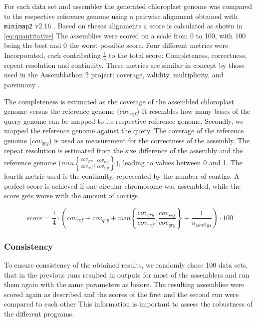 \documentclass{bmcart}
\begin{document}

For each data set and assembler the generated chloroplast genome was compared to the respective reference genome using a pairwise alignment obtained with \texttt{minimap2} v2.16 \cite{li2018minimap2}. Based on theses alignments a score is calculated as shown in \cref{eq:quantitative}
The assemblies were scored on a scale from 0 to 100, with 100 being the best and 0 the worst possible score. Four different metrics were Incorporated, each contributing  $\frac{1}{4}$ to the total score: Completeness, correctness, repeat resolution and continuity.
These metrics are similar in concept by those used in the Assemblathon 2 project: coverage, validity, multiplicity, and parsimony \cite{assemblathon2}.

The completeness is estimated as the coverage of the assembled chloroplast genome versus the reference genome ($cov_{ref}$)
It resembles how many bases of the query genome can be mapped to its respective reference genome.
Secondly, we mapped the reference genome against the query.
The coverage of the reference genome ($cov_{qry}$) is used as measurement for the correctness of the assembly.
The repeat resolution is estimated from the size difference of the assembly and the reference genome ($min\left\{ \frac{cov_{qry}}{cov_{ref}}, \frac{cov_{ref}}{cov_{qry}}\right\}$), leading to values between 0 and 1.
The fourth metric used is the continuity, represented by the number of contigs.
A perfect score is achieved if one circular chromosome was assembled, while the score gets worse with the amount of contigs.

\begin{equation}
   score = \frac{1}{4} \cdot \left( cov_{ref} +  cov_{qry} + min\left\{ \frac{cov_{qry}}{cov_{ref}}, \frac{cov_{ref}}{cov_{qry}}\right\} + \frac{1}{n_{contigs} }\right) \cdot 100 
   \label{eq:quantitative}
\end{equation}

\subsubsection*{Consistency}
To ensure consistency of the obtained results, we randomly chose  \num{100} data sets, that in the previous runs resulted in outputs for most of the assemblers and run them again with the same parameters as before.
The resulting assemblies were scored again as described and the scores of the first and the second run were compared to each other
This information is important to assess the robustness of the different programs.
\end{document}
